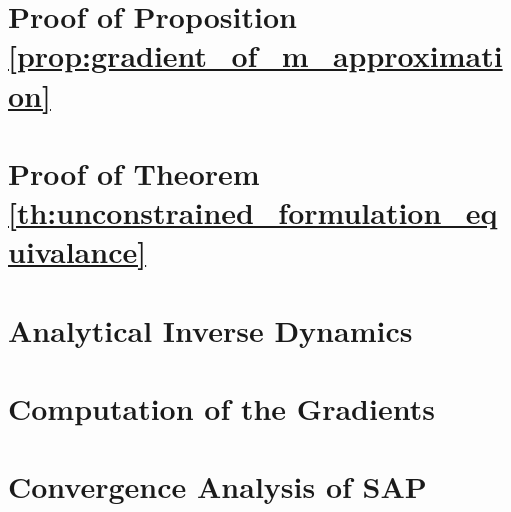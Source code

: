 \section{Proof of Proposition \ref{prop:gradient_of_m_approximation}}
\label{app:gradient_of_m_approximation}


%

\section{Proof of Theorem \ref{th:unconstrained_formulation_equivalance}}
\label{app:unconstrained_formulation_equivalance}


\section{Analytical Inverse Dynamics}
\label{app:analytical_inverse_dynamics_derivations}


\section{Computation of the Gradients}
\label{app:gradients_derivation}


\section{Convergence Analysis of SAP}
\label{app:sap_converge}



